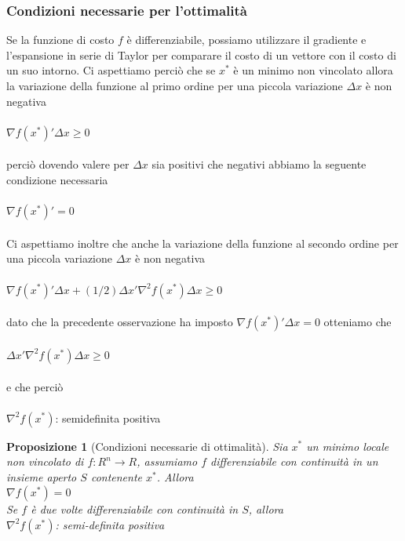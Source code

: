\documentclass[a4paper, 12pt]{article}
\newtheorem{prop}{Proposizione}
\begin{document}
\subsubsection{Condizioni necessarie per l'ottimalità}
Se la funzione di costo $f$ è differenziabile, possiamo utilizzare il gradiente e l'espansione in serie di Taylor per comparare il costo di un vettore con il costo di un suo intorno.
Ci aspettiamo perciò che se $x^\ast$ è un minimo non vincolato allora la variazione della funzione al primo ordine per una piccola variazione $\Delta x$ è non negativa\\\\
$\nabla f ( x^\ast )' \Delta x \geq 0$\\\\
perciò dovendo valere per $\Delta x$ sia positivi che negativi abbiamo la seguente condizione necessaria\\\\
$\nabla f ( x^\ast )' = 0$\\\\
Ci aspettiamo inoltre che anche la variazione della funzione al secondo ordine per una piccola variazione $\Delta x$ è non negativa\\\\
$\nabla f ( x^\ast )' \Delta x + (1/2) \Delta x' \nabla ^2 f (x^\ast) \Delta x\geq 0$\\\\
dato che la precedente osservazione ha imposto $\nabla f (x^\ast)' \Delta x = 0$ otteniamo che\\\\
$\Delta x' \nabla ^2 f (x^\ast) \Delta x\geq 0$\\\\
e che perciò\\\\
$\nabla ^2 f (x^\ast)$: semidefinita  positiva
\begin{prop}[Condizioni necessarie di ottimalità]
Sia $x^\ast$ un minimo locale non vincolato di $f:R^n \to R$, assumiamo $f$ differenziabile con continuità in un insieme aperto $S$ contenente $x^\ast$. Allora\\
$\nabla f(x^\ast) = 0$\\
Se $f$ è due volte differenziabile con continuità in $S$, allora\\
$\nabla^2 f(x^\ast)$: semi-definita positiva
\end{prop}
\end{document}
